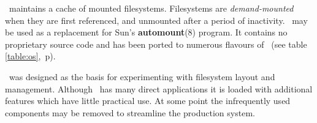 %
%
%
%



\Amd\ maintains a cache of mounted filesystems.  Filesystems are {\em demand-mounted}
when they are first referenced, and unmounted after a period of inactivity.
\Amd\ may be used as a replacement for Sun's {\bf automount}(8)
\cite{usenix:automounter,sun:automount} program.
It contains no proprietary source code and has been ported
to numerous flavours of \Unix\ (see table \ref{table:os},~p\pageref{table:os}).

\Amd\ was designed as the basis for experimenting with filesystem
layout and management.  Although \amd\ has many direct applications it
is loaded with additional features which have little practical use.
At some point the infrequently used components may be removed to
streamline the production system.


